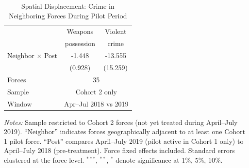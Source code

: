 \begin{table}[t]
\centering
\caption{Spatial Displacement: Crime in Neighboring Forces During Pilot Period}
\label{tab:displacement}
\begin{tabular}{lcc}
\hline\hline
 & Weapons & Violent \\
 & possession & crime \\
\hline
\addlinespace
Neighbor $\times$ Post & -1.448 & -13.555 \\
 & (0.928) & (15.259) \\
\addlinespace
Forces & \multicolumn{2}{c}{35} \\
Sample & \multicolumn{2}{c}{Cohort 2 only} \\
Window & \multicolumn{2}{c}{Apr--Jul 2018 vs 2019} \\
\hline\hline
\end{tabular}
\begin{tablenotes}
\item \textit{Notes:} Sample restricted to Cohort 2 forces (not yet treated during April--July 2019). ``Neighbor'' indicates forces geographically adjacent to at least one Cohort 1 pilot force. ``Post'' compares April--July 2019 (pilot active in Cohort 1 only) to April--July 2018 (pre-treatment). Force fixed effects included. Standard errors clustered at the force level. $^{***}$, $^{**}$, $^{*}$ denote significance at 1\%, 5\%, 10\%.
\end{tablenotes}
\end{table}
